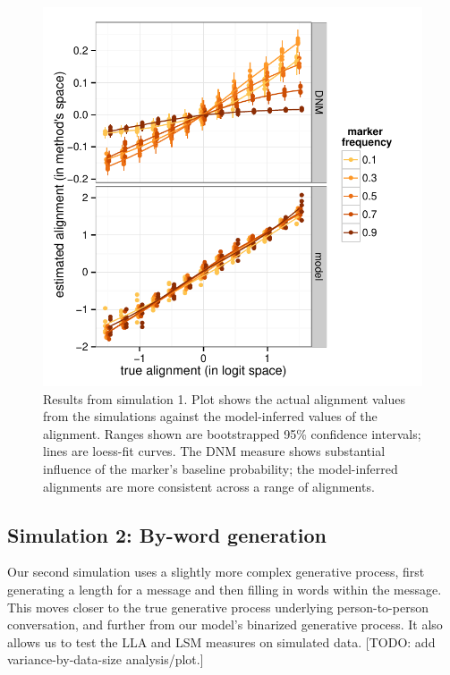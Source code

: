 \documentclass{acm_proc_article-sp}
\begin{document}
\begin{figure}
\centering
\includegraphics[width=\columnwidth]{graphics/www2016_simulation1_crossiter.pdf}
\caption{Results from simulation 1. Plot shows the actual alignment values from the simulations against the model-inferred values of the alignment. Ranges shown are bootstrapped 95\% confidence intervals; lines are loess-fit curves. The DNM measure shows substantial influence of the marker's baseline probability; the model-inferred alignments are more consistent across a range of alignments.}\label{fig:sim1}
\end{figure}

\subsection{Simulation 2: By-word generation}
Our second simulation uses a slightly more complex generative process, first generating a length for a message and then filling in words within the message.  This moves closer to the true generative process underlying person-to-person conversation, and further from our model's binarized generative process.  It also allows us to test the LLA and LSM measures on simulated data. [TODO: add variance-by-data-size analysis/plot.]
\end{document}
